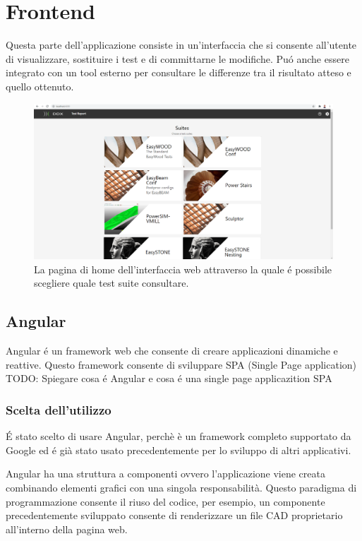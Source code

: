 \chapter{Frontend}
    Questa parte dell'applicazione consiste in un'interfaccia che si consente all'utente di visualizzare, sostituire i test e di committarne le modifiche.
    Pu\'o anche essere integrato con un tool esterno per consultare le differenze tra il risultato atteso e quello ottenuto.
    \begin{figure}
        \includegraphics[width=\textwidth]{images/homepage.png}
        \caption{La pagina di home dell'interfaccia web attraverso la quale \'e possibile scegliere quale test suite consultare.}
    \end{figure}
    \section{Angular}
        Angular \'e un framework web che consente di creare applicazioni dinamiche e reattive.    
        Questo framework consente di sviluppare SPA (Single Page application)
        TODO: Spiegare cosa \'e Angular e cosa \'e una single page applicazition SPA
        \subsection{Scelta dell'utilizzo}
            \'E stato scelto di usare Angular, perchè è un framework completo supportato da Google
            ed \'e già stato usato precedentemente per lo sviluppo di altri applicativi.
            
            Angular ha una struttura a componenti ovvero l'applicazione viene creata combinando elementi grafici con una singola responsabilità.
            Questo paradigma di programmazione consente il riuso del codice, per esempio, un componente precedentemente sviluppato consente
            di renderizzare un file CAD proprietario all'interno della pagina web.
        
